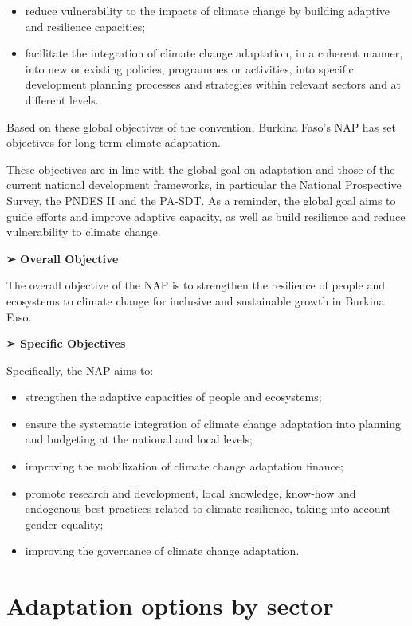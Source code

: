 \documentclass[
]{book}
\begin{document}
\begin{itemize}
\item
  reduce vulnerability to the impacts of climate change by building adaptive and resilience capacities;
\item
  facilitate the integration of climate change adaptation, in a coherent manner, into new or existing policies, programmes or activities, into specific development planning processes and strategies within relevant sectors and at different levels.
\end{itemize}

Based on these global objectives of the convention, Burkina Faso's NAP has set objectives for long-term climate adaptation.

These objectives are in line with the global goal on adaptation and those of the current national development frameworks, in particular the National Prospective Survey, the PNDES II and the PA-SDT. As a reminder, the global goal aims to guide efforts and improve adaptive capacity, as well as build resilience and reduce vulnerability to climate change.

\textbf{➢ Overall Objective}

The overall objective of the NAP is to strengthen the resilience of people and ecosystems to climate change for inclusive and sustainable growth in Burkina Faso.

\textbf{➢ Specific Objectives}

Specifically, the NAP aims to:

\begin{itemize}
\item
  strengthen the adaptive capacities of people and ecosystems;
\item
  ensure the systematic integration of climate change adaptation into planning and budgeting at the national and local levels;
\item
  improving the mobilization of climate change adaptation finance;
\item
  promote research and development, local knowledge, know-how and endogenous best practices related to climate resilience, taking into account gender equality;
\item
  improving the governance of climate change adaptation.
\end{itemize}

\section{Adaptation options by sector}\label{adaptation-options-by-sector}
\end{document}
